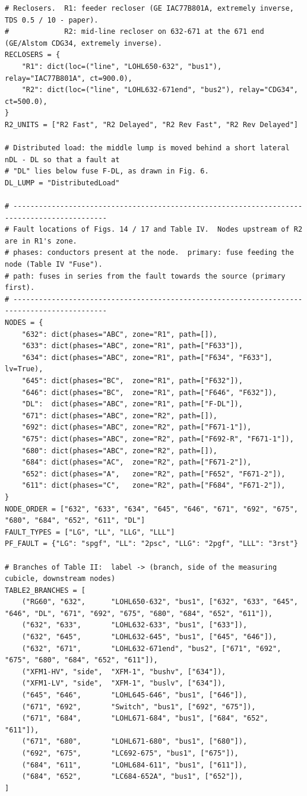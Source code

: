 \documentclass[12pt,a4paper]{article}
\begin{document}
\begin{lstlisting}
# Reclosers.  R1: feeder recloser (GE IAC77B801A, extremely inverse, TDS 0.5 / 10 - paper).
#             R2: mid-line recloser on 632-671 at the 671 end (GE/Alstom CDG34, extremely inverse).
RECLOSERS = {
    "R1": dict(loc=("line", "LOHL650-632", "bus1"), relay="IAC77B801A", ct=900.0),
    "R2": dict(loc=("line", "LOHL632-671end", "bus2"), relay="CDG34", ct=500.0),
}
R2_UNITS = ["R2 Fast", "R2 Delayed", "R2 Rev Fast", "R2 Rev Delayed"]

# Distributed load: the middle lump is moved behind a short lateral nDL - DL so that a fault at
# "DL" lies below fuse F-DL, as drawn in Fig. 6.
DL_LUMP = "DistributedLoad"

# --------------------------------------------------------------------------------------------
# Fault locations of Figs. 14 / 17 and Table IV.  Nodes upstream of R2 are in R1's zone.
# phases: conductors present at the node.  primary: fuse feeding the node (Table IV "Fuse").
# path: fuses in series from the fault towards the source (primary first).
# --------------------------------------------------------------------------------------------
NODES = {
    "632": dict(phases="ABC", zone="R1", path=[]),
    "633": dict(phases="ABC", zone="R1", path=["F633"]),
    "634": dict(phases="ABC", zone="R1", path=["F634", "F633"], lv=True),
    "645": dict(phases="BC",  zone="R1", path=["F632"]),
    "646": dict(phases="BC",  zone="R1", path=["F646", "F632"]),
    "DL":  dict(phases="ABC", zone="R1", path=["F-DL"]),
    "671": dict(phases="ABC", zone="R2", path=[]),
    "692": dict(phases="ABC", zone="R2", path=["F671-1"]),
    "675": dict(phases="ABC", zone="R2", path=["F692-R", "F671-1"]),
    "680": dict(phases="ABC", zone="R2", path=[]),
    "684": dict(phases="AC",  zone="R2", path=["F671-2"]),
    "652": dict(phases="A",   zone="R2", path=["F652", "F671-2"]),
    "611": dict(phases="C",   zone="R2", path=["F684", "F671-2"]),
}
NODE_ORDER = ["632", "633", "634", "645", "646", "671", "692", "675", "680", "684", "652", "611", "DL"]
FAULT_TYPES = ["LG", "LL", "LLG", "LLL"]
PF_FAULT = {"LG": "spgf", "LL": "2psc", "LLG": "2pgf", "LLL": "3rst"}

# Branches of Table II:  label -> (branch, side of the measuring cubicle, downstream nodes)
TABLE2_BRANCHES = [
    ("RG60", "632",      "LOHL650-632", "bus1", ["632", "633", "645", "646", "DL", "671", "692", "675", "680", "684", "652", "611"]),
    ("632", "633",       "LOHL632-633", "bus1", ["633"]),
    ("632", "645",       "LOHL632-645", "bus1", ["645", "646"]),
    ("632", "671",       "LOHL632-671end", "bus2", ["671", "692", "675", "680", "684", "652", "611"]),
    ("XFM1-HV", "side",  "XFM-1", "bushv", ["634"]),
    ("XFM1-LV", "side",  "XFM-1", "buslv", ["634"]),
    ("645", "646",       "LOHL645-646", "bus1", ["646"]),
    ("671", "692",       "Switch", "bus1", ["692", "675"]),
    ("671", "684",       "LOHL671-684", "bus1", ["684", "652", "611"]),
    ("671", "680",       "LOHL671-680", "bus1", ["680"]),
    ("692", "675",       "LC692-675", "bus1", ["675"]),
    ("684", "611",       "LOHL684-611", "bus1", ["611"]),
    ("684", "652",       "LC684-652A", "bus1", ["652"]),
]


\end{lstlisting}
\end{document}
